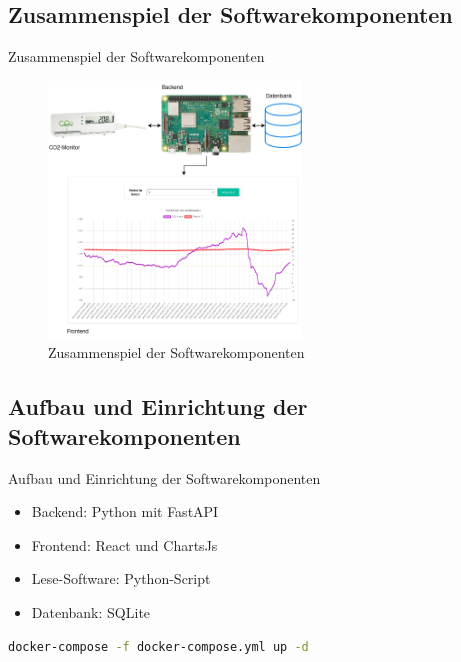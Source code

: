 \documentclass[10pt,ngerman]{beamer}
\begin{document}
\subsection{Zusammenspiel der Softwarekomponenten}

\begin{frame}[fragile]{Zusammenspiel der Softwarekomponenten}
  \begin{figure}
    \centering
    \captionsetup{justification=centering}
    \includegraphics[width=0.6\textwidth]{pictures/SoftwareZusammenspiel.png}
    \caption{Zusammenspiel der Softwarekomponenten}
  \end{figure}
\end{frame}

\subsection{Aufbau und Einrichtung der Softwarekomponenten}

\begin{frame}[fragile]{Aufbau und Einrichtung der Softwarekomponenten}

  \begin{minipage}[t]{0.49\textwidth}
    \begin{itemize}
      \item Backend: Python mit FastAPI
      \item Frontend: React und ChartsJs
      \item Lese-Software: Python-Script
      \item Datenbank: SQLite
    \end{itemize}
  \end{minipage}

  \begin{lstlisting}[language=Bash]
    docker-compose -f docker-compose.yml up -d
  \end{lstlisting}
\end{frame}
\end{document}
